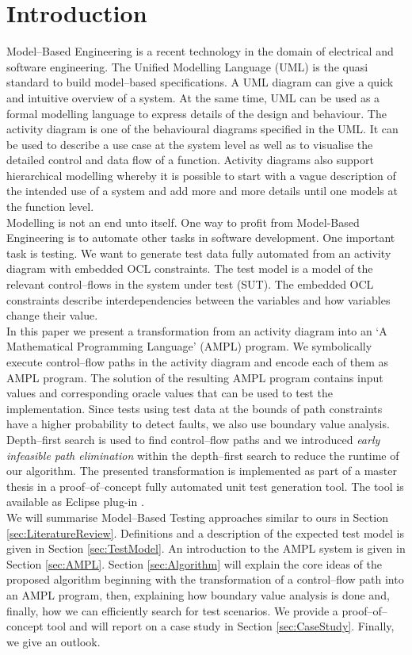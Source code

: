 \documentclass[runningheads,a4paper]{llncs}%
\begin{document}
\section{Introduction}%
Model--Based Engineering is a recent technology in the domain of electrical and software engineering. 
The Unified Modelling Language\textsuperscript{\texttrademark} (UML) is the quasi standard to build model--based specifications. A UML diagram can give a quick and intuitive overview of a system. At the same time, UML can be used as a formal modelling language to express details of the design and behaviour. The activity diagram is one of the behavioural diagrams specified in the UML. It can be used to describe a use case at the system level as well as to visualise the detailed control and data flow of a function. Activity diagrams also support hierarchical modelling whereby it is possible to start with a vague description of the intended use of a system and add more and more details until one models at the function level.\\%
Modelling is not an end unto itself. One way to profit from Model-Based Engineering is to automate other tasks in software development. One important task is testing. We want to generate test data fully automated from an activity diagram with embedded OCL constraints. The test model is a model of the relevant control--flows in the system under test (SUT). The embedded OCL constraints describe interdependencies between the variables and how variables change their value.\\
In this paper we present a transformation from an activity diagram into an `A Mathematical Programming Language' (AMPL) program. We symbolically execute control--flow paths in the activity diagram and encode each of them as AMPL program. The solution of the resulting AMPL program contains input values and corresponding oracle values that can be used to test the implementation. Since tests using test data at the bounds of path constraints have a higher probability to detect faults, we also use boundary value analysis. Depth--first search is used to find control--flow paths and we introduced \emph{early infeasible path elimination} within the depth--first search to reduce the runtime of our algorithm. The presented transformation is implemented as part of a master thesis \cite{Kurth2014AutomatedGen} in a proof--of--concept fully automated unit test generation tool. The tool is available as Eclipse plug-in \cite{PartegWebsite}.\\%
We will summarise Model--Based Testing approaches similar to ours in Section \ref{sec:LiteratureReview}. Definitions and a description of the expected test model is given in Section \ref{sec:TestModel}. 
An introduction to the AMPL system is given in Section \ref{sec:AMPL}. 
Section \ref{sec:Algorithm} will explain the core ideas of the proposed algorithm beginning with the transformation of a control--flow path into an AMPL program, then, explaining how boundary value analysis is done and, finally, how we can efficiently search for test scenarios. We provide a proof--of--concept tool and will report on a case study in Section \ref{sec:CaseStudy}. Finally, we give an outlook.%
\end{document}

